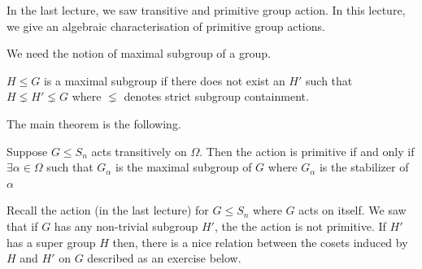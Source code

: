 
In the last lecture, we saw transitive and primitive group action. In this
lecture, we give an algebraic characterisation of primitive group actions.

We need the notion of maximal subgroup of a group.
\begin{definition}
$H \leq G$ is a maximal subgroup if there does not exist an $H'$ such that 
$H \lneq H' \lneq G$ where $\lneq$ denotes strict subgroup containment.
\end{definition}

The main theorem is the following.
\begin{theorem}
	Suppose $G \le S_n$ acts transitively on $\Omega$. Then the action is
	primitive if and only if $\exists \alpha \in \Omega$ such that
	$G_{\alpha}$ is the maximal subgroup of $G$ where $G_\alpha$ is the
	stabilizer of $\alpha$
	\label{thm:primitive-action}
\end{theorem}

Recall the action (in the last lecture) for $G \le S_n$ where $G$ acts on
itself. We saw that if $G$ has any non-trivial subgroup $H'$, the the action is
not primitive. If $H'$ has a super group $H$ then, there is a nice relation
between the cosets induced by $H$ and $H'$ on $G$ described as an exercise
below.

